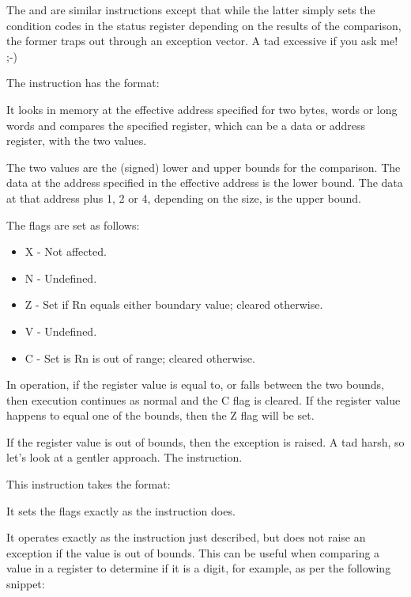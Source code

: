 The  and  are similar instructions except that while the latter simply sets the condition codes in the status register depending on the results of the comparison, the former traps out through an exception vector. A tad excessive if you ask me! ;-)

The  instruction has the format:


It looks in memory at the effective address specified for two bytes, words or long words and compares the specified register, which can be a data or address register, with the two values.

The two values are the (signed) lower and upper bounds for the comparison. The data at the address specified in the effective address is the lower bound. The data at that address plus 1, 2 or 4, depending on the size, is the upper bound.

The flags are set as follows:

\begin{itemize}
    \item X - Not affected.
    \item N - Undefined.
    \item Z - Set if Rn equals either boundary value; cleared otherwise.
    \item V - Undefined.
    \item C - Set is Rn is out of range; cleared otherwise.
\end{itemize}

In operation, if the register value is equal to, or falls between the two bounds, then execution continues as normal and the C flag is cleared. If the register value happens to equal one of the bounds, then the Z flag will be set.

If the register value is out of bounds, then the exception is raised. A tad harsh, so let's look at a gentler approach. The  instruction.

This instruction takes the format:


It sets the flags exactly as the  instruction does.

It operates exactly as the  instruction just described, but does not raise an exception if the value is out of bounds. This can be useful when comparing a value in a register to determine if it is a digit, for example, as per the following snippet:


